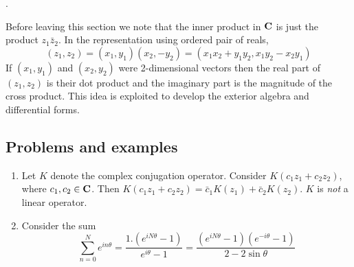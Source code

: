 {\color{red}{Add Lagrange's identity}}.

Before leaving this section we note that the inner product in $\mathbf{C}$ is just
the product $z_1\bar{z}_2$. In the representation using ordered pair of reals,
\[
(z_1, z_2) = (x_1, y_1)(x_2, -y_2) = (x_1x_2 + y_1y_2, x_1y_2 - x_2y_1)
\]
If $(x_1, y_1)$ and $(x_2, y_2)$ were 2-dimensional vectors then the real part
of $(z_1, z_2)$ is their dot product and the imaginary part is the magnitude of
the cross product. This idea is exploited to develop the exterior algebra and
differential forms.

\subsection{Problems and examples}
\begin{enumerate}
\item Let $K$ denote the complex conjugation operator. Consider $K(c_1z_1 + 
c_2z_2)$, where $c_1, c_2 \in \mathbf{C}$. Then $K(c_1z_1 + c_2z_2) = \bar{c}_1K(z_1)
+ \bar{c}_2K(z_2)$. $K$ is \emph{not} a linear operator.

\item Consider the sum
\[
\sum_{n=0}^N e^{in\theta} = \frac{1.(e^{iN\theta} - 1)}{e^{i\theta} - 1}
= \frac{(e^{iN\theta} - 1)(e^{-i\theta} - 1)}{2 - 2\sin\theta}
\]
\end{enumerate}
